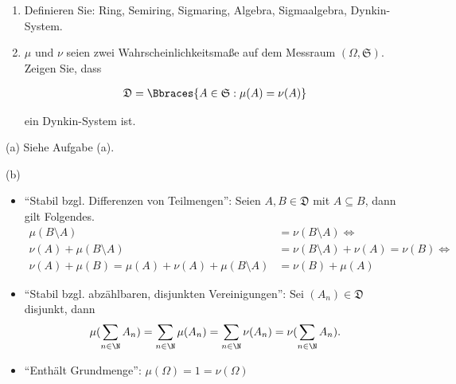
\begin{exercise}

\phantom{}

\begin{enumerate}[label = (\alph*)]

  \item
  Definieren Sie: Ring, Semiring, Sigmaring, Algebra, Sigmaalgebra, Dynkin-System.
  
  \item
  $\mu$ und $\nu$ seien zwei Wahrscheinlichkeitsmaße auf dem Messraum $(\Omega, \mathfrak{S})$. Zeigen Sie, dass
  
  \begin{align*}
    \mathfrak{D} = \Bbraces{A \in \mathfrak{S} : \mu(A) = \nu(A)}
  \end{align*}
  
  ein Dynkin-System ist.

\end{enumerate}

\end{exercise}


\begin{solution}

(a) Siehe Aufgabe (a).

(b)

\begin{itemize}

  \item \enquote{Stabil bzgl. Differenzen von Teilmengen}: Seien $A, B \in \mathfrak{D}$ mit $A \subseteq B$, dann gilt Folgendes.
  \begin{align*}
    \mu(B \setminus A)
    & =
    \nu(B \setminus A)
    \Leftrightarrow \\
    \nu(A) + \mu(B \setminus A)
    & =
    \nu(B \setminus A) + \nu(A)
    =
    \nu(B)
    \Leftrightarrow \\
    \nu(A) + \mu(B)
    =
    \mu(A) + \nu(A) + \mu(B \setminus A)
    & =
    \nu(B) + \mu(A)
  \end{align*}

  \item \enquote{Stabil bzgl. abzählbaren, disjunkten Vereinigungen}: Sei $(A_n) \in \mathfrak{D}$ disjunkt, dann
  \begin{align*}
    \mu(\sum_{n \in \N} A_n)
    =
    \sum_{n \in \N} \mu(A_n)
    =
    \sum_{n \in \N} \nu(A_n)
    =
    \nu(\sum_{n \in \N} A_n).
  \end{align*}

  \item \enquote{Enthält Grundmenge}: $\mu(\Omega) = 1 = \nu(\Omega)$

\end{itemize}

\end{solution}

